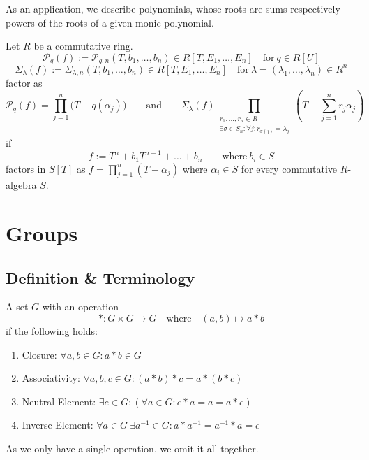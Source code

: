 As an application, we describe polynomials, whose roots are sums respectively powers of the roots of a given monic polynomial.
\begin{proposition}
   Let \(R\) be a commutative ring.
   \[\mathscr{P}_q(f) := \mathscr{P}_{q,n}(T, b_1, \ldots, b_n) \in R[T, E_1, \ldots, E_n] \quad\text{for}~q \in R[U]\]
   \[\Sigma_{\lambda}(f) := \Sigma_{\lambda, n}(T, b_1, \ldots, b_n) \in R[T, E_1, \ldots, E_n] \quad\text{for}~\lambda=(\lambda_1, \ldots, \lambda_n) \in R^n\]
   factor as
   \[\mathscr{P}_q(f) = \prod_{j=1}^n\big(T - q(\alpha_j)\big) \qquad\text{and}\qquad \Sigma_{\lambda}(f) \prod_{\substack{r_1, \ldots, r_n \in R\\\exists \sigma \in S_n: \forall j: r_{\sigma(j)} = \lambda_j}} \left(T - \sum_{j=1}^n r_j\alpha_j\right)\]
   if
   \[f := T^n + b_1T^{n-1} + \ldots + b_n \qquad\text{where}~b_i\in S\]
   factors in \(S[T]\) as \(f = \prod_{j=1}^n (T - \alpha_j)\) where \(\alpha_i \in S\) for every commutative \(R\)-algebra \(S\).
\end{proposition}

\newpage

\section{Groups}
\subsection{Definition \& Terminology}
\begin{definition}[Group]
   A set \(G\) with an operation
   \[\ast: G \times G \to G \quad\text{where}\quad (a, b) \mapsto a \ast b\]
   if the following holds:
   \begin{enumerate}[label=\roman*, align=Center]
      \item Closure: \(\forall a, b \in G: a \ast b \in G\)
      \item Associativity: \(\forall a, b, c \in G: (a \ast b) \ast c = a \ast (b \ast c)\)
      \item Neutral Element: \(\exists e \in G: (\forall a \in G: e \ast a = a = a \ast e)\)
      \item Inverse Element: \(\forall a \in G~\exists a^{-1} \in G: a \ast a^{-1} = a^{-1} \ast a = e\)
   \end{enumerate}
\end{definition}
\begin{remark}[Notation]
   As we only have a single operation, we omit it all together.
\end{remark}

